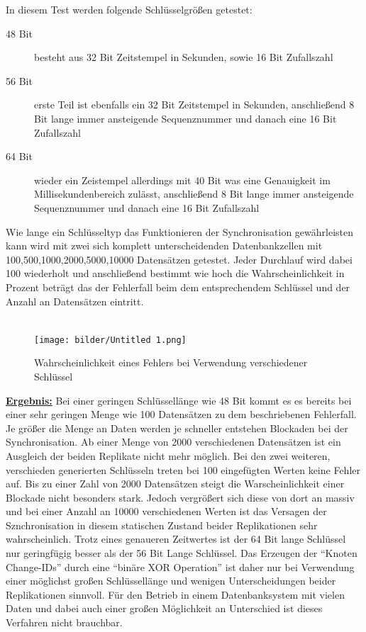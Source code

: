 \documentclass[a4paper,11pt,oneside,%
headsepline,												%
footsepline,												%
bibtotocnumbered									%
]{scrreprt}
\begin{document}
In diesem Test werden folgende Schlüsselgrößen getestet:
\begin{description}
	\item[48 Bit] besteht aus 32 Bit Zeitstempel in Sekunden, sowie 16 Bit Zufallszahl
	\item[56 Bit] erste Teil ist ebenfalls ein 32 Bit Zeitstempel in Sekunden, anschließend 8 Bit lange immer ansteigende Sequenznummer und danach eine 16 Bit Zufallszahl
	\item[64 Bit] wieder ein Zeistempel allerdings mit 40 Bit was eine Genauigkeit im Millisekundenbereich zulässt, anschließend 8 Bit lange immer ansteigende Sequenznummer und danach eine 16 Bit Zufallszahl
\end{description}
	
Wie lange ein Schlüsseltyp das Funktionieren der Synchronisation gewährleisten kann wird mit zwei sich komplett unterscheidenden Datenbankzellen mit 100,500,1000,2000,5000,10000  Datensätzen getestet. Jeder Durchlauf wird dabei 100 wiederholt und anschließend bestimmt wie hoch die Wahrscheinlichkeit in Prozent beträgt das der Fehlerfall beim dem entsprechendem Schlüssel und der Anzahl an Datensätzen eintritt.\\\\
\begin{figure}[h!]
    \centering
    \texttt{[image: bilder/Untitled 1.png]}
    \caption{Wahrscheinlichkeit eines Fehlers bei Verwendung verschiedener Schlüssel}
\end{figure}
\underline{{\bf Ergebnis:}} Bei einer geringen Schlüssellänge wie 48 Bit kommt es es bereits bei einer sehr geringen Menge wie 100 Datensätzen zu dem beschriebenen Fehlerfall. Je größer die Menge an Daten werden je schneller entstehen Blockaden bei der Synchronisation. Ab einer Menge von 2000 verschiedenen Datensätzen ist ein Ausgleich der beiden Replikate nicht mehr möglich. Bei den zwei weiteren, verschieden generierten Schlüsseln treten bei 100 eingefügten Werten keine Fehler auf. Bis zu einer Zahl von 2000 Datensätzen steigt die Warscheinlichkeit einer Blockade nicht besonders stark. Jedoch vergrößert sich diese von dort an massiv und bei einer Anzahl an 10000 verschiedenen Werten ist das Versagen der Sznchronisation in diesem statischen Zustand beider Replikationen sehr wahrscheinlich. Trotz eines genaueren Zeitwertes ist der 64 Bit lange Schlüssel nur geringfügig besser als der 56 Bit Lange Schlüssel. Das Erzeugen der \enquote{Knoten Change-IDs} durch eine \enquote{binäre XOR Operation} ist daher nur bei Verwendung einer möglichst großen Schlüssellänge und wenigen Unterscheidungen beider Replikationen sinnvoll. Für den Betrieb in einem Datenbanksystem mit vielen Daten und dabei auch einer großen Möglichkeit an Unterschied ist dieses Verfahren nicht brauchbar.\\\\
\end{document}
